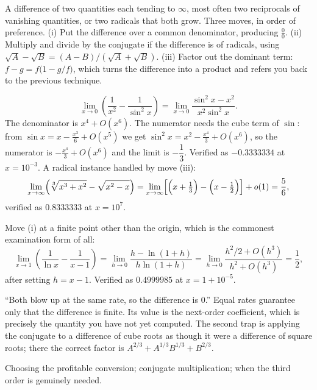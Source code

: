 \cue A difference of two quantities each tending to $\infty$, most often two reciprocals of vanishing quantities, or two radicals that both grow.
\method Three moves, in order of preference. (i) Put the difference over a common denominator, producing $\tfrac00$. (ii) Multiply and divide by the conjugate if the difference is of radicals, using $\sqrt{A}-\sqrt{B}=(A-B)/(\sqrt A+\sqrt B)$. (iii) Factor out the dominant term: $f-g=f\bigl(1-g/f\bigr)$, which turns the difference into a product and refers you back to the previous technique.

\begin{worked}
\[
\lim_{x\to0}\left(\frac{1}{x^{2}}-\frac{1}{\sin^{2}x}\right)
=\lim_{x\to0}\frac{\sin^{2}x-x^{2}}{x^{2}\sin^{2}x}.
\]
The denominator is $x^{4}+O(x^{6})$. The numerator needs the cube term of $\sin$: from $\sin x=x-\tfrac{x^{3}}{6}+O(x^{5})$ we get $\sin^{2}x=x^{2}-\tfrac{x^{4}}{3}+O(x^{6})$, so the numerator is $-\tfrac{x^{4}}{3}+O(x^{6})$ and the limit is $-\dfrac13$. Verified as $-0.3333334$ at $x=10^{-3}$. A radical instance handled by move (iii):
\[
\lim_{x\to\infty}\Bigl(\sqrt[3]{x^{3}+x^{2}}-\sqrt{x^{2}-x}\Bigr)
=\lim_{x\to\infty}\Bigl[\Bigl(x+\tfrac13\Bigr)-\Bigl(x-\tfrac12\Bigr)\Bigr]+o(1)=\frac56 ,
\]
verified as $0.8333333$ at $x=10^{7}$.

Move (i) at a finite point other than the origin, which is the commonest examination form of all:
\[
\lim_{x\to1}\left(\frac{1}{\ln x}-\frac{1}{x-1}\right)
=\lim_{h\to0}\frac{h-\ln(1+h)}{h\ln(1+h)}
=\lim_{h\to0}\frac{h^{2}/2+O(h^{3})}{h^{2}+O(h^{3})}=\frac12 ,
\]
after setting $h=x-1$. Verified as $0.4999985$ at $x=1+10^{-5}$.
\end{worked}

\begin{trap}
``Both blow up at the same rate, so the difference is $0$.'' Equal rates guarantee only that the difference is finite. Its value is the next-order coefficient, which is precisely the quantity you have not yet computed. The second trap is applying the conjugate to a difference of cube roots as though it were a difference of square roots; there the correct factor is $A^{2/3}+A^{1/3}B^{1/3}+B^{2/3}$.
\end{trap}

\begin{seealsob}Choosing the profitable conversion; conjugate multiplication; when the third order is genuinely needed.\end{seealsob}

